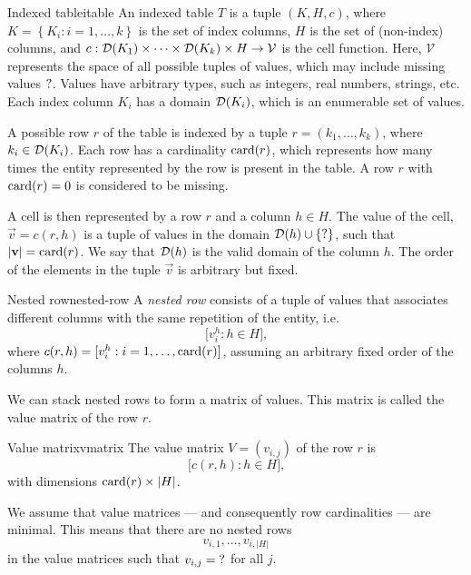 \begin{defbox}{Indexed table}{itable}
An indexed table $T$ is a tuple $(K, H, c)$, where $K = \left\{K_i : i = 1, \dots,
k\right\}$ is the set of index columns, $H$ is the set of (non-index) columns, and $c :
\domainof{K_1} \times \dots \times \domainof{K_k} \times H \to \mathcal{V}$ is the cell function.
Here, $\mathcal{V}$ represents the space of all possible tuples of values, which
may include missing values $\missing$.  Values have arbitrary types, such as integers,
real numbers, strings, etc.
Each index column $K_i$ has a domain $\domainof{K_i}$, which is an enumerable set of
values.
\end{defbox}

A possible row $r$ of the table is indexed by a tuple $r = (k_1, \dots,
k_k)$, where $k_i \in \domainof{K_i}$.  Each row has a cardinality $\rowcard[r]$, which
represents how many times the entity represented by the row is present in the table.
A row $r$ with $\rowcard[r] = 0$ is considered to be missing.

A cell is then represented by a row $r$ and a column $h \in H$.  The value of the cell,
$\vec{v} = c(r, h)$ is a tuple of values in the domain $\domainof{h} \cup \{\missing\}$,
such that $|\vec{v}| = \rowcard[r]$.  We say that $\domainof{h}$ is the valid domain of
the column $h$.
The order of the elements in the tuple $\vec{v}$ is arbitrary but fixed.

\begin{defbox}{Nested row}{nested-row}
A \emph{nested
row} consists of a tuple of values that associates different columns with the same
repetition of the entity, i.e. \[
  \Big[ v^h_i : h \in H \Big]\text{,}
\]
where $c(r, h) = [v^h_i : i = 1, \dots, \rowcard[r]]$, assuming an arbitrary fixed order
of the columns $h$.
\end{defbox}

We can stack nested rows to form a matrix of values.  This matrix is called the value
matrix of the row $r$.

\begin{defbox}{Value matrix}{vmatrix}
The value matrix $V = (v_{i, j})$ of the row $r$ is \[
  \Big[ c(r, h) : h \in H \Big]\text{,}
\] with dimensions $\rowcard[r] \times |H|$.
\end{defbox}

We assume that value matrices --- and consequently row cardinalities --- are minimal. This
means that there are no nested rows $$v_{i, 1}, \dots, v_{i, |H|}$$ in the value matrices
such that $v_{i, j} = \missing$ for all $j$.

